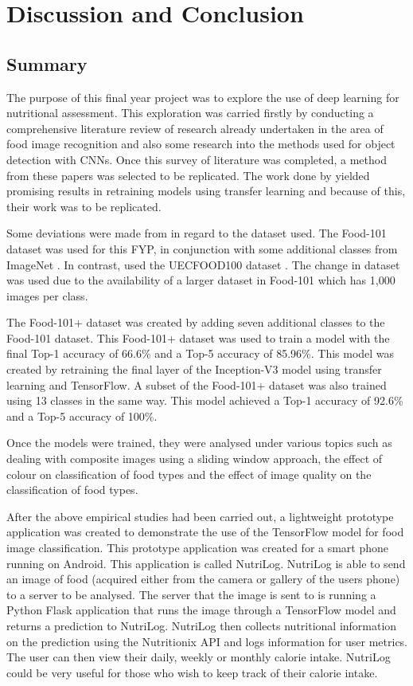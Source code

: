 \chapter{Discussion and Conclusion}
\section{Summary}
The purpose of this final year project was to explore the use of deep learning for nutritional assessment.
This exploration was carried firstly by conducting a comprehensive literature review of research already undertaken in the area of food image recognition and also some research into the methods used for object detection with CNNs.
Once this survey of literature was completed, a method from these papers was selected to be replicated.
The work done by \parencite{yanaiFood} yielded promising results in retraining models using transfer learning and because of this, their work was to be replicated.

Some deviations were made from \parencite{yanaiFood} in regard to the dataset used.
The Food-101 dataset was used for this FYP, in conjunction with some additional classes from ImageNet \parencite{imagenet}.
In contrast, \parencite{yanaiFood} used the UECFOOD100 dataset \parencite{uecFood}.
The change in dataset was used due to the availability of a larger dataset in Food-101 which has 1,000 images per class.

The Food-101+ dataset was created by adding seven additional classes to the Food-101 dataset.
This Food-101+ dataset was used to train a model with the final Top-1 accuracy of 66.6\% and a Top-5 accuracy of  85.96\%.
This model was created by retraining the final layer of the Inception-V3 \parencite{rethinkingInception} model using transfer learning and TensorFlow.
A subset of the Food-101+ dataset was also trained using 13 classes in the same way.
This model achieved a Top-1 accuracy of 92.6\% and a Top-5 accuracy of 100\%.

Once the models were trained, they were analysed under various topics such as
dealing with composite images using a sliding window approach, the effect of colour on classification of food types and the effect of image quality on the classification of food types.

After the above empirical studies had been carried out, a lightweight prototype application was created to demonstrate the use of the TensorFlow model for food image classification.
This prototype application was created for a smart phone running on Android.
This application is called NutriLog.
NutriLog is able to send an image of food (acquired either from the camera or gallery of the users phone) to a server to be analysed.
The server that the image is sent to is running a Python Flask application that runs the image through a TensorFlow model and returns a prediction to NutriLog.
NutriLog then collects nutritional information on the prediction using the Nutritionix API and logs information for user metrics.
The user can then view their daily, weekly or monthly calorie intake.
NutriLog could be very useful for those who wish to keep track of their calorie intake.

